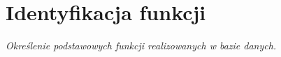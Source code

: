 \section{Identyfikacja funkcji}

\textit{Określenie podstawowych funkcji realizowanych w bazie danych.} \\

